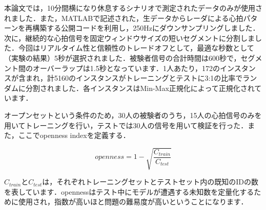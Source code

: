 \documentclass[dvipdfmx]{jsarticle}
\begin{document}
本論文では，10分間横になり休息するシナリオで測定されたデータのみが使用されました．また，MATLABで記述された，生データからレーダによる心拍パターンを再構築する公開コードを利用し，250Hzにダウンサンプリングしました．次に，継続的な心拍信号を固定ウィンドウサイズの短いセグメントに分割しました．今回はリアルタイム性と信頼性のトレードオフとして，最適な秒数として（実験の結果）5秒が選択されました．被験者信号の合計時間は600秒で，セグメント間のオーバーラップは1.5秒となっています．1人あたり，172のインスタンスが含まれ，計5160のインスタンスがトレーニングとテストに3:1の比率でランダムに分割されました．各インスタンスはMin-Max正規化によって正規化されています．

オープンセットという条件のため，30人の被験者のうち，15人の心拍信号のみを用いてトレーニングを行い，テストでは30人の信号を用いて検証を行った．また，ここでopenness indexを定義する．

\begin{equation}\label{}
openness = 1 - \sqrt{\frac{C_{train}}{C_{test}}}
\end{equation}

$C_{train}とC_{test}$は，それぞれトレーニングセットとテストセット内の既知のIDの数を表しています．opennessはテスト中にモデルが遭遇する未知数を定量化するために使用され，指数が高いほと問題の難易度が高いということになります．
\end{document}
